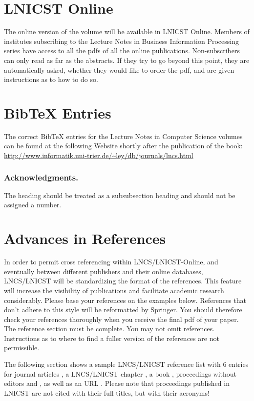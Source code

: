 \documentclass[lnicst,sechang,a4paper]{svmultln}
\begin{document}
\section{LNICST Online}

The online version of the volume will be available in LNICST Online.
Members of institutes subscribing to the Lecture Notes in Business Information
Processing series have access to all the pdfs of all the online
publications. Non-subscribers can only read as far as the abstracts. If
they try to go beyond this point, they are automatically asked, whether
they would like to order the pdf, and are given instructions as to how
to do so.

\section{BibTeX Entries}

The correct BibTeX entries for the Lecture Notes in Computer Science
volumes can be found at the following Website shortly after the
publication of the book:
\url{http://www.informatik.uni-trier.de/~ley/db/journals/lncs.html}

\subsubsection*{Acknowledgments.} The heading should be treated as a
subsubsection heading and should not be assigned a number.

\section{Advances in References}\label{references}

In order to permit cross referencing within LNCS/LNICST-Online, and eventually
between different publishers and their online databases, LNCS/LNICST will
be standardizing the format of the references. This
feature will increase the visibility of publications and facilitate
academic research considerably. Please base your references on the
examples below. References that don't adhere to this style will be
reformatted by Springer. You should therefore check your references
thoroughly when you receive the final pdf of your paper.
The reference section must be complete. You may not omit references.
Instructions as to where to find a fuller version of the references are
not permissible.

The following section shows a sample LNCS/LNICST reference list with 6 entries for
journal articles \cite{jour}, a LNCS/LNICST chapter \cite{lnicstchap}, a book
\cite{book}, proceedings without editors \cite{proceeding1} and
\cite{proceeding2}, as well as an URL \cite{url}.
Please note that proceedings published in LNICST are not cited with their
full titles, but with their acronyms!
\end{document}
